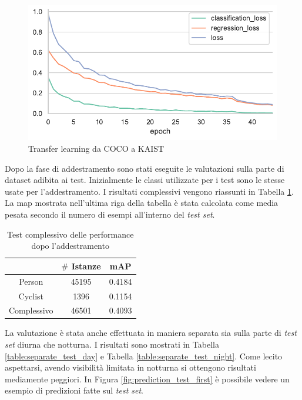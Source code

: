 \begin{figure}[h]
    \centering
    \includegraphics[width=\textwidth]{images/graphic/ruby-yogurt.pdf}
    \caption{Transfer learning da COCO a KAIST}
    \label{fig:fine_tuning_1}
\end{figure}

Dopo la fase di addestramento sono stati eseguite le valutazioni sulla parte di dataset adibita ai test. Inizialmente le classi utilizzate per i test sono le stesse usate per l'addestramento. I risultati complessivi vengono riassunti in Tabella \ref{table:first_test}. La \ac{map} mostrata nell'ultima riga della tabella è stata calcolata come media pesata secondo il numero di esempi all'interno del \textit{test set}.

\begin{table}[]
    \centering
    \begin{tabular}{|c|c|c|}
    \hline
                & $\#$ Istanze & mAP    \\ \hline
    Person      & 45195             & 0.4184 \\ \hline
    Cyclist     & 1396              & 0.1154 \\ \hline
    Complessivo & 46501             & 0.4093 \\ \hline
    \end{tabular}
    \caption{Test complessivo delle performance dopo l'addestramento}
    \label{table:first_test}
\end{table}

La valutazione è stata anche effettuata in maniera separata sia sulla parte di \textit{test set} diurna che notturna. I risultati sono mostrati in Tabella \ref{table:separate_test_day} e Tabella \ref{table:separate_test_night}. Come lecito aspettarsi, avendo visibilità limitata in notturna si ottengono risultati mediamente peggiori. In Figura \ref{fig:prediction_test_first} è possibile vedere un esempio di predizioni fatte sul \textit{test set}.


